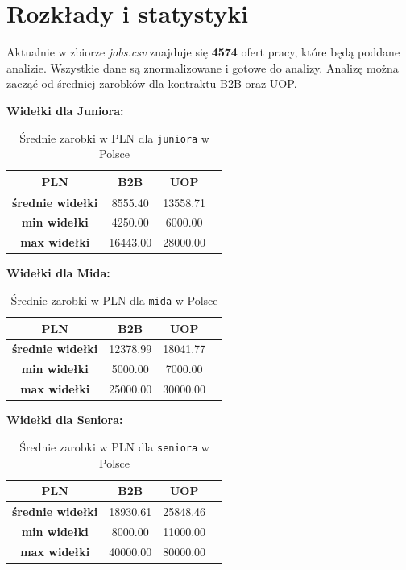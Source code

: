 \documentclass{article}
\begin{document}
\newpage

\section{Rozkłady i statystyki}

\quad Aktualnie w zbiorze \textit{jobs.csv} znajduje się \textbf{4574} ofert pracy, które będą poddane
analizie. Wszystkie dane są znormalizowane i gotowe do analizy. Analizę można zacząć od średniej zarobków
dla kontraktu B2B oraz UOP.


\textbf{Widełki dla Juniora: }

\begin{table}[h]
    \centering
    \begin{tabular}{|c|c|c|c|}
        \hline
        \textbf{PLN}             & \textbf{B2B} & \textbf{UOP} \\ \hline
        \textbf{średnie widełki} & 8555.40      & 13558.71     \\ \hline
        \textbf{min widełki}     & 4250.00      & 6000.00      \\ \hline
        \textbf{max widełki}     & 16443.00     & 28000.00     \\ \hline
    \end{tabular}
    \caption{Średnie zarobki w PLN dla \texttt{juniora} w Polsce}
\end{table}

\textbf{Widełki dla Mida: }

\begin{table}[h]
    \centering
    \begin{tabular}{|c|c|c|c|}
        \hline
        \textbf{PLN}             & \textbf{B2B} & \textbf{UOP} \\ \hline
        \textbf{średnie widełki} & 12378.99     & 18041.77     \\ \hline
        \textbf{min widełki}     & 5000.00      & 7000.00      \\ \hline
        \textbf{max widełki}     & 25000.00     & 30000.00     \\ \hline
    \end{tabular}
    \caption{Średnie zarobki w PLN dla \texttt{mida} w Polsce}
\end{table}

\textbf{Widełki dla Seniora: }

\begin{table}[h]
    \centering
    \begin{tabular}{|c|c|c|c|}
        \hline
        \textbf{PLN}             & \textbf{B2B} & \textbf{UOP} \\ \hline
        \textbf{średnie widełki} & 18930.61     & 25848.46     \\ \hline
        \textbf{min widełki}     & 8000.00      & 11000.00     \\ \hline
        \textbf{max widełki}     & 40000.00     & 80000.00     \\ \hline
    \end{tabular}
    \caption{Średnie zarobki w PLN dla \texttt{seniora} w Polsce}
\end{table}
\newpage
\end{document}
